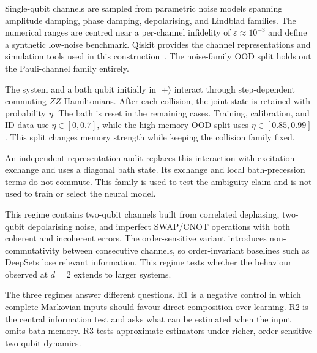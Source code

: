 \documentclass[12pt]{iopart}
\newcommand{\eps}{\varepsilon}
\begin{document}
\begin{description}[itemsep=3pt,topsep=2pt,leftmargin=*]
\item[(R1) Device regime ($d{=}2$, $\eps \approx 10^{-3}$).]
Single-qubit channels are sampled from parametric noise models spanning amplitude damping, phase damping, depolarising, and Lindblad families. The numerical ranges are centred near a per-channel infidelity of $\eps \approx 10^{-3}$ and define a synthetic low-noise benchmark. Qiskit provides the channel representations and simulation tools used in this construction~\cite{ibm_fake_backends}. The noise-family OOD split holds out the Pauli-channel family entirely.

\item[(R2) Non-Markovian collision regime ($d{=}2$, $\eps \approx 0.4$).]
The system and a bath qubit initially in $|+\rangle$ interact through step-dependent commuting $ZZ$ Hamiltonians. After each collision, the joint state is retained with probability $\eta$. The bath is reset in the remaining cases. Training, calibration, and ID data use $\eta\in[0,0.7]$, while the high-memory OOD split uses $\eta\in[0.85,0.99]$. This split changes memory strength while keeping the collision family fixed.

An independent representation audit replaces this interaction with excitation exchange and uses a diagonal bath state. Its exchange and local bath-precession terms do not commute. This family is used to test the ambiguity claim and is not used to train or select the neural model.

\item[(R3) Two-qubit order-sensitive regime ($d{=}4$).]
This regime contains two-qubit channels built from correlated dephasing, two-qubit depolarising noise, and imperfect SWAP/CNOT operations with both coherent and incoherent errors. The order-sensitive variant introduces non-commutativity between consecutive channels, so order-invariant baselines such as DeepSets lose relevant information. This regime tests whether the behaviour observed at $d=2$ extends to larger systems.
\end{description}

The three regimes answer different questions. R1 is a negative control in which complete Markovian inputs should favour direct composition over learning. R2 is the central information test and asks what can be estimated when the input omits bath memory. R3 tests approximate estimators under richer, order-sensitive two-qubit dynamics.
\end{document}
